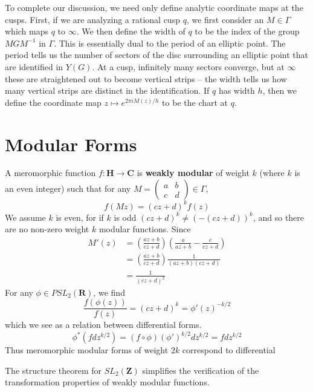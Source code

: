 To complete our discussion, we need only define analytic coordinate maps at the cusps. First, if we are analyzing a rational cusp $q$, we first consider an $M \in \Gamma$ which maps $q$ to $\infty$. We then define the width of $q$ to be the index of the group $MGM^{-1}$ in $\Gamma$. This is essentially dual to the period of an elliptic point. The period tells us the number of sectors of the disc surrounding an elliptic point that are identified in $Y(G)$. At a cusp, infinitely many sectors converge, but at $\infty$ these are straightened out to become vertical strips -- the width tells us how many vertical strips are distinct in the identification. If $q$ has width $h$, then we define the coordinate map $z \mapsto e^{2 \pi i M(z) / h}$ to be the chart at $q$.

\section{Modular Forms}

A meromorphic function $f: \mathbf{H} \to \mathbf{C}$ is {\bf weakly modular} of weight $k$ (where $k$ is an even integer) such that for any $M = \left(\begin{smallmatrix} a & b \\ c & d \end{smallmatrix}\right) \in \Gamma$,
%
\[ f(Mz) = (cz + d)^k f(z) \]
%
We assume $k$ is even, for if $k$ is odd $(cz + d)^k \neq (-(cz + d))^k$, and so there are no non-zero weight $k$ modular functions. Since
%
\begin{align*}
    M'(z) &= \left( \frac{az + b}{cz + d} \right) \left( \frac{a}{az + b} - \frac{c}{cz + d} \right)\\
    &= \left( \frac{az + b}{cz + d} \right) \frac{1}{(az + b)(cz + d)}\\
    &= \frac{1}{(cz + d)^2}
\end{align*}
%
For any $\phi \in PSL_2(\mathbf{R})$, we find
%
\[ \frac{f(\phi(z))}{f(z)}  = (cz + d)^k = \phi'(z)^{-k/2} \]
%
which we see as a relation between differential forms.
%
\[ \phi^*(f dz^{k/2}) = (f \circ \phi) (\phi')^{k/2} dz^{k/2} = f dz^{k/2} \]
%
Thus meromorphic modular forms of weight $2k$ correspond to differential 

The structure theorem for $SL_2(\mathbf{Z})$ simplifies the verification of the transformation properties of weakly modular functions.

